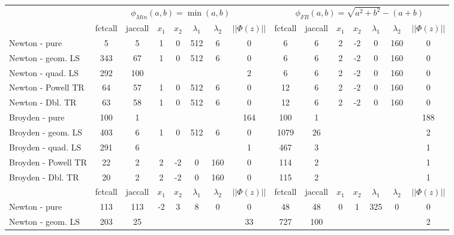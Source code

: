 \documentclass[11pt]{article}
\begin{document}
\begin{table}[htb!]

\begin{scriptsize}
\begin{tabular}{l|ccccccc|ccccccc}
 & \multicolumn{7}{c|}{$\phi_{Min}(a,b)=\min(a,b)$} & \multicolumn{7}{c}{$\phi_{FB}(a,b)=\sqrt{a^2+b^2} -(a+b)$} \\
   &  fctcall  &  jaccall  &  $x_1$  &  $x_2$  &  $\lambda_1$  &  $\lambda_2$  &  $||\Phi(z)||$  &  fctcall  &  jaccall  &  $x_1$  &  $x_2$  &  $\lambda_1$  &  $\lambda_2$  &  $||\Phi(z)||$ \\ 
\hline   
Newton - pure  &   5  &  5  &  1  &  0  &  512  &  6  &  0  &  6  &  6  &  2  &  -2  &  0  &  160  &  0 \\ 
Newton - geom. LS  &   343  &  67  &  1  &  0  &  512  &  6  &  0  &  6  &  6  &  2  &  -2  &  0  &  160  &  0 \\ 
Newton - quad. LS  &   292  &  100  &    &    &    &    &  2  &  6  &  6  &  2  &  -2  &  0  &  160  &  0 \\ 
Newton - Powell TR  &   64  &  57  &  1  &  0  &  512  &  6  &  0  &  12  &  6  &  2  &  -2  &  0  &  160  &  0 \\ 
Newton - Dbl. TR  &   63  &  58  &  1  &  0  &  512  &  6  &  0  &  12  &  6  &  2  &  -2  &  0  &  160  &  0 \\ 
Broyden - pure  &   100  &  1  &    &    &    &    &  164  &  100  &  1  &    &    &    &    &  188 \\ 
Broyden - geom. LS  &   403  &  6  &  1  &  0  &  512  &  6  &  0  &  1079  &  26  &    &    &    &    &  2 \\ 
Broyden - quad. LS  &   291  &  6  &    &    &    &    &  1  &  467  &  3  &    &    &    &    &  1 \\ 
Broyden - Powell TR  &   22  &  2  &  2  &  -2  &  0  &  160  &  0  &  114  &  2  &    &    &    &    &  1 \\ 
Broyden - Dbl. TR  &   20  &  2  &  2  &  -2  &  0  &  160  &  0  &  115  &  2  &    &    &    &    &  1 \\ 
\hline
   &  fctcall  &  jaccall  &  $x_1$  &  $x_2$  &  $\lambda_1$  &  $\lambda_2$  &  $||\Phi(z)||$  &  fctcall  &  jaccall  &  $x_1$  &  $x_2$  &  $\lambda_1$  &  $\lambda_2$  &  $||\Phi(z)||$ \\ 
\hline   
Newton - pure  &   113  &  113  &  -2  &  3  &  8  &  0  &  0  &  48  &  48  &  0  &  1  &  325  &  0  &  0 \\ 
Newton - geom. LS  &   203  &  25  &    &    &    &    &  33  &  727  &  100  &    &    &    &    &  2 \\ 

\end{tabular}
\end{scriptsize}
\end{table}
\end{document}
